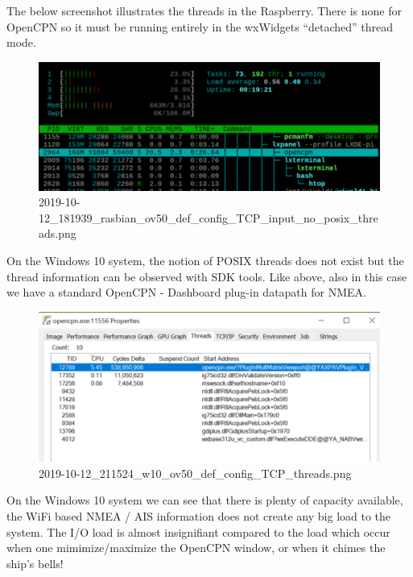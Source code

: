\documentclass[11pt]{article}
\begin{document}
    The below screenshot illustrates the threads in the Raspberry. There is
none for OpenCPN so it must be running entirely in the wxWidgets
``detached'' thread mode.

    \begin{figure}
\centering
\includegraphics{2019-10-12_181939_rasbian_ov50_def_config_TCP_input_no_posix_threads.png}
\caption{2019-10-12\_181939\_rasbian\_ov50\_def\_config\_TCP\_input\_no\_posix\_threads.png}
\end{figure}

    On the Windows 10 system, the notion of POSIX threads does not exist but
the thread information can be observed with SDK tools. Like above, also
in this case we have a standard OpenCPN - Dashboard plug-in datapath for
NMEA.

    \begin{figure}
\centering
\includegraphics{2019-10-12_211524_w10_ov50_def_config_TCP_threads.png}
\caption{2019-10-12\_211524\_w10\_ov50\_def\_config\_TCP\_threads.png}
\end{figure}

    On the Windows 10 system we can see that there is plenty of capacity
available, the WiFi based NMEA / AIS information does not create any big
load to the system. The I/O load is almost insignifiant compared to the
load which occur when one mimimize/maximize the OpenCPN window, or when
it chimes the ship's bells!
\end{document}
